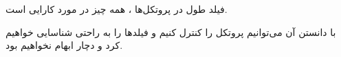 \begin{boxK}
    فیلد طول در پروتکل‌ها ، همه چیز در مورد کارایی است.

    با دانستن آن می‌توانیم پروتکل را کنترل کنیم و فیلد‌ها را به راحتی شناسایی خواهیم کرد و دچار ابهام نخواهیم بود.
\end{boxK}